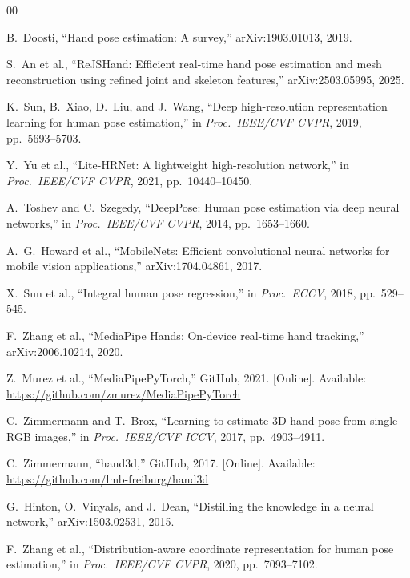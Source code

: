 \documentclass[11pt,conference,a4paper]{APSIPA2026}
\begin{document}
\scriptsize
\begin{thebibliography}{00}

B.~Doosti, ``Hand pose estimation: A survey,''
arXiv:1903.01013, 2019.

S.~An et al.,
``ReJSHand: Efficient real-time hand pose estimation and mesh reconstruction
using refined joint and skeleton features,''
arXiv:2503.05995, 2025.

K.~Sun, B.~Xiao, D.~Liu, and J.~Wang,
``Deep high-resolution representation learning for human pose estimation,''
in \textit{Proc.\ IEEE/CVF CVPR}, 2019, pp.~5693--5703.

Y.~Yu et al.,
``Lite-HRNet: A lightweight high-resolution network,''
in \textit{Proc.\ IEEE/CVF CVPR}, 2021, pp.~10440--10450.

A.~Toshev and C.~Szegedy,
``DeepPose: Human pose estimation via deep neural networks,''
in \textit{Proc.\ IEEE/CVF CVPR}, 2014, pp.~1653--1660.

A.~G.~Howard et al.,
``MobileNets: Efficient convolutional neural networks for mobile vision applications,''
arXiv:1704.04861, 2017.

X.~Sun et al.,
``Integral human pose regression,''
in \textit{Proc.\ ECCV}, 2018, pp.~529--545.

F.~Zhang et al.,
``MediaPipe Hands: On-device real-time hand tracking,''
arXiv:2006.10214, 2020.

Z.~Murez et al.,
``MediaPipePyTorch,'' GitHub, 2021. [Online].
Available: \url{https://github.com/zmurez/MediaPipePyTorch}

C.~Zimmermann and T.~Brox,
``Learning to estimate 3D hand pose from single RGB images,''
in \textit{Proc.\ IEEE/CVF ICCV}, 2017, pp.~4903--4911.

C.~Zimmermann,
``hand3d,'' GitHub, 2017. [Online].
Available: \url{https://github.com/lmb-freiburg/hand3d}

G.~Hinton, O.~Vinyals, and J.~Dean,
``Distilling the knowledge in a neural network,''
arXiv:1503.02531, 2015.

F.~Zhang et al.,
``Distribution-aware coordinate representation for human pose estimation,''
in \textit{Proc.\ IEEE/CVF CVPR}, 2020, pp.~7093--7102.


\end{thebibliography}
\end{document}

